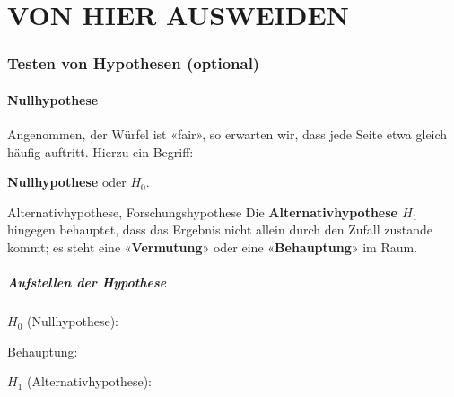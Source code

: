 
\part{VON HIER AUSWEIDEN}
\section{Testen von Hypothesen (optional)}


\subsection{Nullhypothese}
Angenommen, der Würfel ist «fair», so erwarten wir, dass jede Seite
etwa gleich häufig auftritt. Hierzu ein Begriff:

\begin{center}\textbf{Nullhypothese} oder {$H_0$}.\end{center}


\begin{definition}{Alternativhypothese, Forschungshypothese}{}
Die \textbf{Alternativhypothese $H_1$} hingegen behauptet, dass das
Ergebnis nicht allein durch den Zufall zustande kommt; es steht eine
«\textbf{Vermutung}» oder eine «\textbf{Behauptung}» im Raum. 
\end{definition}



\subsubsection*{Aufstellen der Hypothese}

\begin{center} $H_0$ (Nullhypothese):

\end{center}

Behauptung:

\begin{center} $H_1$ (Alternativhypothese):

\end{center}


